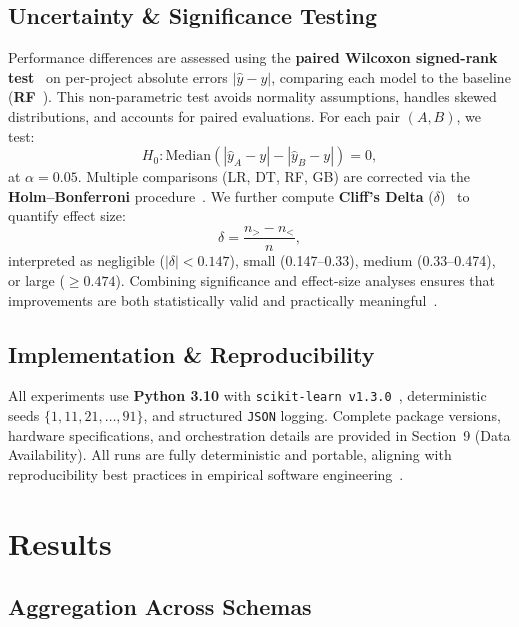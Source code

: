 \documentclass{ieeeaccess}
\begin{document}
\subsection{Uncertainty \& Significance Testing}
\label{sec:statistical-tests}
Performance differences are assessed using the 
\textbf{paired Wilcoxon signed-rank test}~\cite{wilcoxon1945individual} 
on per-project absolute errors $|\hat{y}-y|$, 
comparing each model to the baseline (\textbf{RF}~\cite{breiman2001random}).  
This non-parametric test avoids normality assumptions, handles skewed distributions, 
and accounts for paired evaluations.  
For each pair $(A,B)$, we test:
\[
H_0:\mathrm{Median}(|\hat{y}_A{-}y|-|\hat{y}_B{-}y|)=0,
\]
at $\alpha=0.05$.  
Multiple comparisons (LR, DT, RF, GB) are corrected via 
the \textbf{Holm–Bonferroni} procedure~\cite{holm1979simple}.  
We further compute \textbf{Cliff’s Delta} ($\delta$)~\cite{macbeth2011cliffs} 
to quantify effect size:
\[
\delta=\frac{n_{>}-n_{<}}{n},
\]
interpreted as negligible ($|\delta|<0.147$), small (0.147–0.33), 
medium (0.33–0.474), or large ($\ge0.474$).  
Combining significance and effect-size analyses ensures 
that improvements are both statistically valid and practically meaningful~\cite{demvsar2006statistical,garcia2010advanced}.



\subsection{Implementation \& Reproducibility}
All experiments use \textbf{Python 3.10} with \texttt{scikit-learn v1.3.0}~\cite{pedregosa2011scikit}, deterministic seeds $\{1,11,21,\dots,91\}$, and structured \texttt{JSON} logging.  
Complete package versions, hardware specifications, and orchestration details are provided in Section~9 (Data Availability).
All runs are fully deterministic and portable, 
aligning with reproducibility best practices in 
empirical software engineering~\cite{cruz2019open,lopez2021empirical}.





\section{Results}

\subsection{Aggregation Across Schemas}
\label{sec:aggregation}
\end{document}
